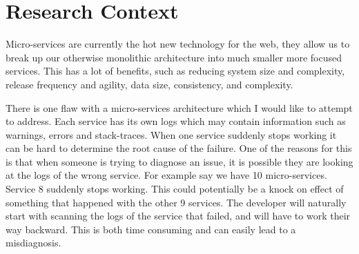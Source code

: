 \chapter{Research Context}
Micro-services are currently the hot new technology for the web, they allow us to break up our otherwise monolithic architecture into much smaller more focused services. This has a lot of benefits, such as reducing system size and complexity, release frequency and agility, data size, consistency, and complexity\cite{7742218}. 

There is one flaw with a micro-services architecture which I would like to attempt to address. Each service has its own logs which may contain information such as warnings, errors and stack-traces. When one service suddenly stops working it can be hard to determine the root cause of the failure. One of the reasons for this is that when someone is trying to diagnose an issue, it is possible they are looking at the logs of the wrong service. For example say we have 10 micro-services. Service 8 suddenly stops working. This could potentially be a knock on effect of something that happened with the other 9 services. The developer will naturally start with scanning the logs of the service that failed, and will have to work their way backward. This is both time consuming and can easily lead to a misdiagnosis.